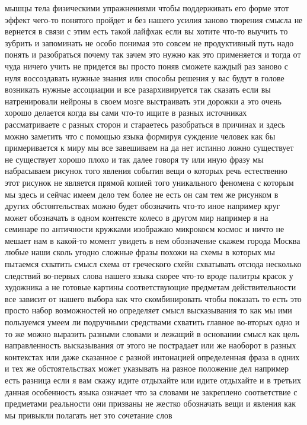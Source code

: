мышцы тела физическими упражнениями чтобы поддерживать его форме этот эффект
чего-то понятого пройдет и без нашего усилия заново творения смысла не вернется
в связи с этим есть такой лайфхак если вы хотите что-то выучить то зубрить и
запоминать не особо понимая это совсем не продуктивный путь надо понять и
разобраться почему так зачем это нужно как это применяется и тогда от чуда
ничего учить не придется вы просто поняв сможете каждый раз заново с нуля
воссоздавать нужные знания или способы решения у вас будут в голове возникать
нужные ассоциации и все разархивируется так сказать если вы натренировали
нейроны в своем мозге выстраивать эти дорожки а это очень хорошо делается когда
вы сами что-то ищите в разных источниках рассматриваете с разных сторон и
стараетесь разобраться в причинах и здесь можно заметить что с помощью языка
формируя суждение человек как бы примеривается к миру мы все завешиваем на да
нет истинно ложно существует не существует хорошо плохо и так далее говоря ту
или иную фразу мы набрасываем рисунок того явления события вещи о которых речь
естественно этот рисунок не является прямой копией того уникального феномена с
которым мы здесь и сейчас имеем дело тем более не есть он сам тем же рисунком в
других обстоятельствах можно будет обозначить что-то иное например круг может
обозначать в одном контексте колесо в другом мир например я на семинаре по
античности кружками изображаю микрокосм космос и ничто не мешает нам в какой-то
момент увидеть в нем обозначение скажем города Москва любые наши сколь угодно
сложные фразы похожи на схемы в которых мы пытаемся схватить смысл схема от
греческого схейн схватывать отсюда несколько следствий во-первых слова нашего
языка скорее что-то вроде палитры красок у художника а не готовые картины
соответствующие предметам действительности все зависит от нашего выбора как что
скомбинировать чтобы показать то есть это просто набор возможностей но
определяет смысл высказывания то как мы ими пользуемся умеем ли подручными
средствами схватить главное во-вторых одно и то же можно выразить разными
словами и лежащий в основании смысл как цель направленность высказывания от
этого не пострадает или же наоборот в разных контекстах или даже сказанное с
разной интонацией определенная фраза в одних и тех же обстоятельствах может
указывать на разное положение дел например есть разница если я вам скажу идите
отдыхайте или идите отдыхайте и в третьих данная особенность языка означает что
за словами не закреплено соответствие с предметами реальности они призваны не
жестко обозначать вещи и явления как мы привыкли полагать нет это сочетание слов
